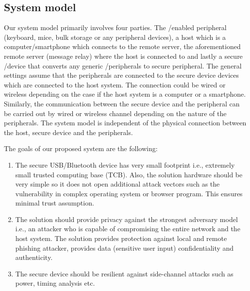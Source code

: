\subsection{System model} 
\label{sec:secureMessage:systemModel}
Our system model primarily involves four parties. The \usb/\bluetooth enabled peripheral (keyboard, mice, bulk storage or any peripheral devices), a host which is a computer/smartphone which connects to the remote server, the aforementioned remote server (message relay) where the host is connected to and lastly a secure \usb/\bluetooth device that converts any generic \usb/\bluetooth peripherals to secure peripheral. The general settings assume that the peripherals are connected to the secure device devices which are connected to the host system. The connection could be wired or wireless depending on the case if the host system is a computer or a smartphone. Similarly, the communication between the secure device and the peripheral can be carried out by wired or wireless channel depending on the nature of the peripherals. The system model is independent of the physical connection between the host, secure device and the peripherals. 



The goals of our proposed system are the following:
\begin{enumerate}
  \item The secure USB/Bluetooth device has very small footprint i.e., extremely small trusted computing base (TCB). Also, the solution hardware should be very simple so it does not open additional attack vectors such as the vulnerability in complex operating system or browser program. This ensures minimal trust assumption.
  
  \item The solution should provide privacy against the strongest adversary model i.e., an attacker who is capable of compromising the entire network and the host system. The solution provides protection against local and remote phishing attacker, provides data (sensitive user input) confidentiality and authenticity.
 
  \item The secure device should be resilient against side-channel attacks such as power, timing analysis etc. 
  

\end{enumerate}



